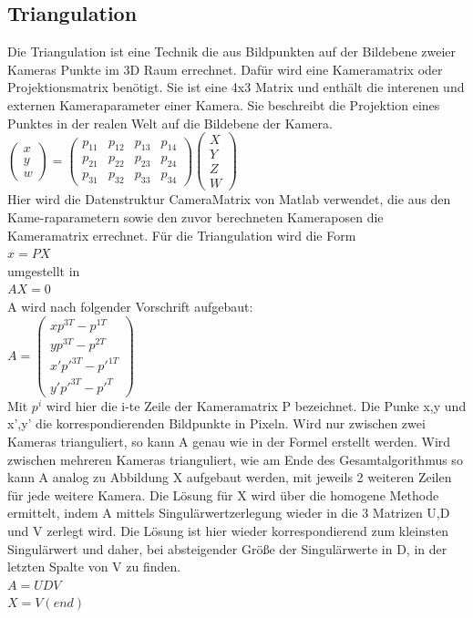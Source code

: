 \subsection{Triangulation}
Die Triangulation ist eine Technik die aus Bildpunkten auf der Bildebene zweier Kameras Punkte im 3D Raum errechnet. Dafür wird eine Kameramatrix oder Projektionsmatrix benötigt. Sie ist eine 4x3 Matrix und enthält die interenen und externen Kameraparameter einer Kamera.  Sie beschreibt die Projektion eines Punktes in der realen Welt auf die Bildebene der Kamera.
\\
$ \begin{pmatrix} x\\y\\w \end{pmatrix} =  \begin{pmatrix} p_11 & p_12 & p_13 & p_14\\  p_21 & p_22 & p_23 & p_24 \\  p_31 & p_32 & p_33 & p_34  \end{pmatrix} \begin{pmatrix} X\\Y\\Z\\W \end{pmatrix}$
\\
Hier wird die Datenstruktur CameraMatrix von Matlab verwendet, die aus den Kame-raparametern sowie den zuvor berechneten Kameraposen die Kameramatrix errechnet.
Für die Triangulation wird die Form
\\
$x = PX$
\\
umgestellt in
\\
$AX = 0$
\\
A wird nach folgender Vorschrift aufgebaut:
\\
$A = \begin{pmatrix} xp^{3T} - p^{1T} \\ yp^{3T} - p^{2T} \\ x'p'^{3T} - p'^{1T} \\ y'p'^{3T} - p'^{T} \end{pmatrix}$
\\
Mit $p^i$ wird hier die i-te Zeile der Kameramatrix P bezeichnet. Die Punke x,y und x’,y’ die korrespondierenden Bildpunkte in Pixeln. Wird nur zwischen zwei Kameras trianguliert, so kann A genau wie in der Formel erstellt werden. Wird zwischen mehreren Kameras trianguliert, wie am Ende des Gesamtalgorithmus so kann A analog zu Abbildung X aufgebaut werden, mit jeweils 2 weiteren Zeilen für jede weitere Kamera.
Die Lösung für X wird über die homogene Methode ermittelt, indem A mittels Singulärwertzerlegung wieder in die 3 Matrizen U,D und V zerlegt wird. Die Lösung ist hier wieder korrespondierend zum kleinsten Singulärwert und daher, bei absteigender Größe der Singulärwerte in D,  in der letzten Spalte von V zu finden.
\\
$A = UDV$
\\
$X = V(end)$
\\

\clearpage

